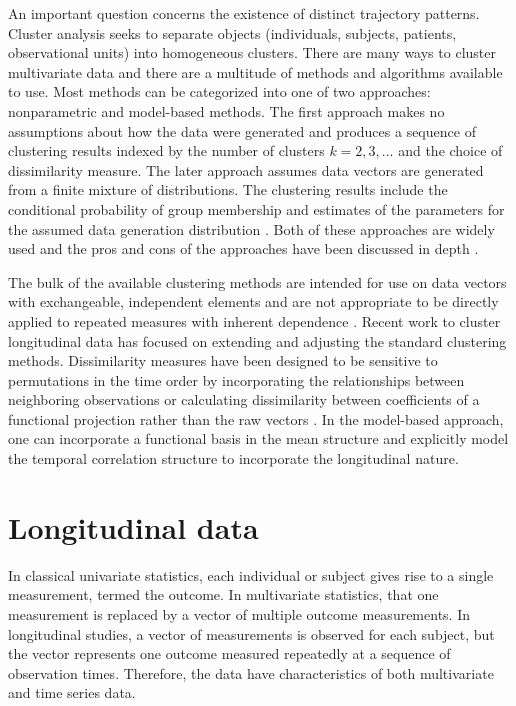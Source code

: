 An important question concerns the existence of distinct trajectory patterns. Cluster analysis seeks to separate objects (individuals, subjects, patients, observational units) into homogeneous clusters. There are many ways to cluster multivariate data and there are a multitude of methods and algorithms available to use. Most methods can be categorized into one of two approaches: nonparametric and model-based methods. The first approach makes no assumptions about how the data were generated and produces a sequence of clustering results indexed by the number of clusters $k=2,3,...$ and the choice of dissimilarity measure. The later approach assumes data vectors are generated from a finite mixture of distributions. The clustering results include the conditional probability of group membership and estimates of the parameters for the assumed data generation distribution \cite{mclachlan2000,fraley1998}. Both of these approaches are widely used and the pros and cons of the approaches have been discussed in depth \cite{magidson2002, everitt1981}.

The bulk of the available clustering methods are intended for use on data vectors with exchangeable, independent elements and are not appropriate to be directly applied to repeated measures with inherent dependence \cite{everitt2009}. Recent work to cluster longitudinal data has focused on extending and adjusting the standard clustering methods. Dissimilarity measures have been designed to be sensitive to permutations in the time order by incorporating the relationships between neighboring observations \cite{chouakria2007} or calculating dissimilarity between coefficients of a functional projection rather than the raw vectors \cite{serban2005, tarpey2003, abraham2003, tarpey2007,hitchcock2007}. In the model-based approach, one can incorporate a functional basis in the mean structure \cite{nagin1999,gaffney1999} and explicitly model the temporal correlation structure \cite{muthen1999,fraley1999,mcnicholas2010} to incorporate the longitudinal nature. 

\section{Longitudinal data}
In classical univariate statistics, each individual or subject gives rise to a single measurement, termed the outcome. In multivariate statistics, that one measurement is replaced by a vector of multiple outcome measurements. In longitudinal studies, a vector of measurements is observed for each subject, but the vector represents one outcome measured repeatedly at a sequence of observation times. Therefore, the data have characteristics of both multivariate and time series data.

